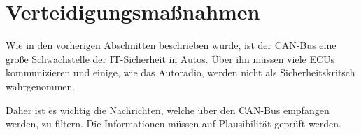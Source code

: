 \section{Verteidigungsmaßnahmen}
Wie in den vorherigen Abschnitten beschrieben wurde, ist der CAN-Bus eine große
Schwachstelle der IT-Sicherheit in Autos. Über ihn müssen viele ECUs
kommunizieren und einige, wie das Autoradio, werden nicht als
Sicherheitskritsch wahrgenommen.

Daher ist es wichtig die Nachrichten, welche über den CAN-Bus empfangen werden,
zu filtern. Die Informationen müssen auf Plausibilität geprüft werden.
